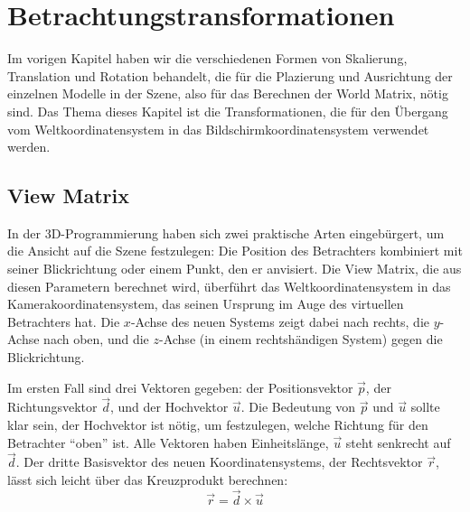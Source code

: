 \chapter{Betrachtungstransformationen}
\label{viewtransformation}
Im vorigen Kapitel haben wir die verschiedenen Formen von Skalierung, Translation und Rotation behandelt, die für die Plazierung und Ausrichtung der einzelnen Modelle in der Szene, also für das Berechnen der World Matrix, nötig sind. Das Thema dieses Kapitel ist die Transformationen, die für den Übergang vom Weltkoordinatensystem in das Bildschirmkoordinatensystem verwendet werden.

\section{View Matrix}
\label{view}
In der 3D-Programmierung haben sich zwei praktische Arten eingebürgert, um die Ansicht auf die Szene festzulegen: Die Position des Betrachters kombiniert mit seiner Blickrichtung oder einem Punkt, den er anvisiert. Die View Matrix, die aus diesen Parametern berechnet wird, überführt das Weltkoordinatensystem in das Kamerakoordinatensystem, das seinen Ursprung im Auge des virtuellen Betrachters hat. Die $x$-Achse des neuen Systems zeigt dabei nach rechts, die $y$-Achse nach oben, und die $z$-Achse (in einem rechtshändigen System) gegen die Blickrichtung.

Im ersten Fall sind drei Vektoren gegeben: der Positionsvektor $\vec p$, der Richtungsvektor $\vec d$, und der Hochvektor $\vec u$. Die Bedeutung von $\vec p$ und $\vec u$ sollte klar sein, der Hochvektor ist nötig, um festzulegen, welche Richtung für den Betrachter \enquote{oben} ist. Alle Vektoren haben Einheitslänge, $\vec u$ steht senkrecht auf $\vec d$. Der dritte Basisvektor des neuen Koordinatensystems, der Rechtsvektor $\vec r$, lässt sich leicht über das Kreuzprodukt berechnen:
\begin{equation}
 \vec r = \vec d \times \vec u
\end{equation}

